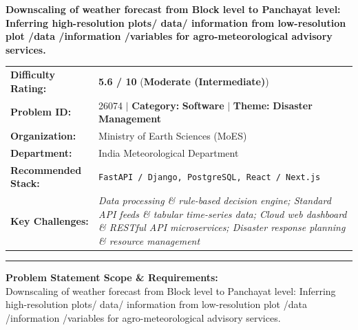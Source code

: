 \documentclass[10pt,a4paper]{article}
\begin{document}
\begin{tcolorbox}[pscard, title={"\textbf{SIH26074} \quad $\vert$ \quad Downscaling of weather forecast from Block level to Panchayat level: Inferr...}]
\textbf{\large Downscaling of weather forecast from Block level to Panchayat level: Inferring high-resolution plots/ data/ information from low-resolution plot /data /information /variables for agro-meteorological advisory services.}\\[0.25cm]

\begin{tabular}{@{}lp{12.5cm}@{}}
\textbf{Difficulty Rating:} & \textcolor{diffmod}{\textbf{\Large 5.6 / 10}} \quad (\textbf{Moderate (Intermediate)}) \\
\textbf{Problem ID:} & 26074 \quad $\vert$ \quad \textbf{Category:} \textbf{Software} \quad $\vert$ \quad \textbf{Theme:} \textbf{Disaster Management} \\
\textbf{Organization:} & Ministry of Earth Sciences (MoES) \\
\textbf{Department:} & India Meteorological Department \\
\textbf{Recommended Stack:} & \texttt{FastAPI / Django, PostgreSQL, React / Next.js} \\
\textbf{Key Challenges:} & \textit{\small Data processing \& rule-based decision engine; Standard API feeds \& tabular time-series data; Cloud web dashboard \& RESTful API microservices; Disaster response planning \& resource management} \\
\end{tabular}

\vspace{0.2cm}
\hrule
\vspace{0.2cm}

\textbf{\color{sihnavy}Problem Statement Scope \& Requirements:}\\[0.15cm]
\noindent\small Downscaling of weather forecast from Block level to Panchayat level: Inferring high-resolution plots/ data/ information from low-resolution plot /data /information /variables for agro-meteorological advisory services.\par\vspace{0.06cm}

\end{tcolorbox}
\vspace{0.4cm}
{}
\end{document}
